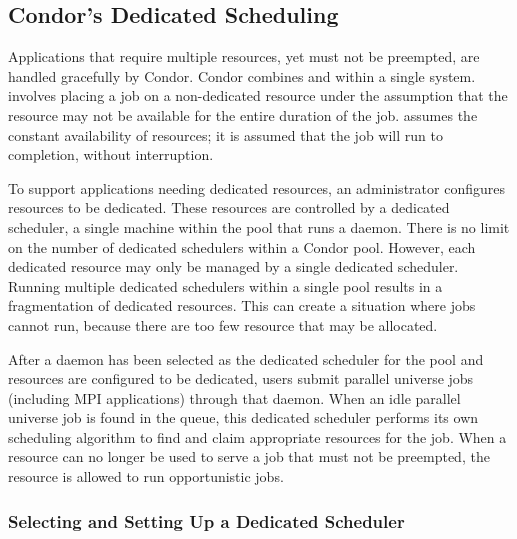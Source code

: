 \subsection{\label{sec:Config-Dedicated-Jobs}
Condor's Dedicated Scheduling} 


Applications that require multiple resources,
yet must not be preempted, are handled gracefully by Condor.
Condor combines
 and  within
a single system.
 involves placing a job on a non-dedicated
resource under the assumption that the resource may not be
available for the entire duration of the job.
 assumes the constant availability of
resources;
it is assumed that the job will run to completion,
without interruption.

To support applications needing dedicated resources,
an administrator 
configures resources to be dedicated.
These resources are controlled by a dedicated scheduler, a
single machine within the pool that runs a  daemon.
There is no limit on the number of dedicated schedulers within
a Condor pool.
However, each dedicated resource may only be managed by a single
dedicated scheduler.
Running multiple dedicated schedulers within a single pool
results in a fragmentation of dedicated resources.
This can create a situation where jobs cannot run, because 
there are too few resource that may be allocated.

After a  daemon has been selected as the dedicated scheduler
for the pool and resources are configured to be
dedicated, users submit parallel universe jobs (including MPI applications)
through that  daemon.
When an idle parallel universe job is found in the queue,
this dedicated scheduler
performs its own scheduling algorithm to find and claim appropriate
resources for the job.
When a resource can no longer be used to serve a job that must
not be preempted, the resource is allowed to run opportunistic jobs.


\subsubsection{\label{sec:Setup-Dedicated-Scheduler}
Selecting and Setting Up a Dedicated Scheduler}

